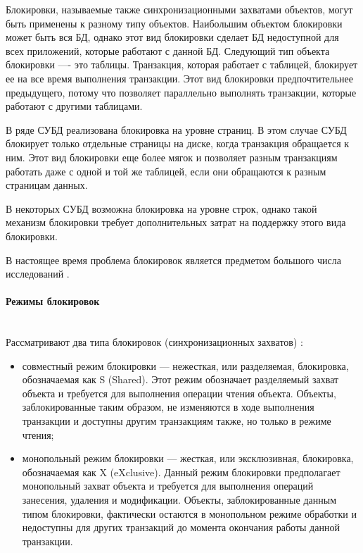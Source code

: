 Блокировки, называемые также синхронизационными захватами объектов, могут быть применены к разному типу объектов. Наибольшим объектом блокировки может быть вся БД, однако этот вид блокировки сделает БД недоступной для всех приложений, которые работают с данной БД. Следующий тип объекта блокировки —- это таблицы. Транзакция, которая работает с таблицей, блокирует ее на все время выполнения транзакции. Этот вид блокировки предпочтительнее предыдущего, потому что позволяет параллельно выполнять транзакции, которые работают с другими таблицами.

В ряде СУБД реализована блокировка на уровне страниц. В этом случае СУБД блокирует только отдельные страницы на диске, когда транзакция обращается к ним. Этот вид блокировки еще более мягок и позволяет разным транзакциям работать даже с одной и той же таблицей, если они обращаются к разным страницам данных.

В некоторых СУБД возможна блокировка на уровне строк, однако такой механизм блокировки требует дополнительных затрат на поддержку этого вида блокировки.

В настоящее время проблема блокировок является предметом большого числа исследований \autocite{Intuit}.

\paragraph{Режимы блокировок} ~\\

Рассматривают два типа блокировок (синхронизационных захватов) \autocite{Intuit}:
\begin{itemize}
\item совместный режим блокировки — нежесткая, или разделяемая, блокировка, обозначаемая как S (Shared). Этот режим обозначает разделяемый захват объекта и требуется для выполнения операции чтения объекта. Объекты, заблокированные таким образом, не изменяются в ходе выполнения транзакции и доступны другим транзакциям также, но только в режиме чтения;
\item монопольный режим блокировки — жесткая, или эксклюзивная, блокировка, обозначаемая как X (eXclusive). Данный режим блокировки предполагает монопольный захват объекта и требуется для выполнения операций занесения, удаления и модификации. Объекты, заблокированные данным типом блокировки, фактически остаются в монопольном режиме обработки и недоступны для других транзакций до момента окончания работы данной транзакции.
\end{itemize}
